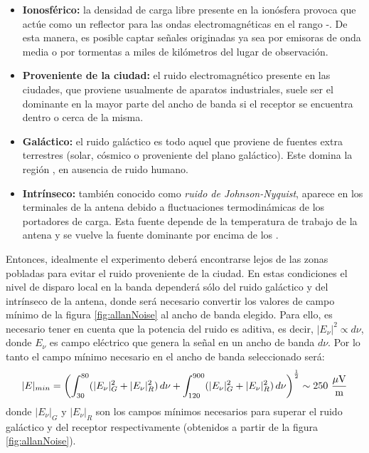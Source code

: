 	\begin{itemize}
	 \item \textbf{Ionosf\'erico:} la densidad de carga libre presente en la ion\'osfera provoca que act\'ue como un reflector para las ondas electromagn\'eticas en el rango -. De esta manera, es posible captar se\~nales originadas ya sea por emisoras de onda media o por tormentas a miles de kil\'ometros del lugar de observaci\'on.
	 \item \textbf{Proveniente de la ciudad:} el ruido electromagn\'etico presente en las ciudades, que proviene usualmente de aparatos industriales, suele ser el dominante en la mayor parte del ancho de banda si el receptor se encuentra dentro o cerca de la misma.
	 \item \textbf{Gal\'actico:} el ruido gal\'actico es todo aquel que proviene de fuentes extra terrestres (solar, c\'osmico o proveniente del plano gal\'actico). Este domina la regi\'on , en ausencia de ruido humano.
	 \item \textbf{Intr\'inseco:} tambi\'en conocido como \emph{ruido de Johnson-Nyquist}, aparece en los terminales de la antena debido a fluctuaciones termodin\'amicas de los portadores de carga. Esta fuente depende de la temperatura de trabajo de la antena y se vuelve la fuente dominante por encima de los .
	\end{itemize}
	
	Entonces, idealmente el experimento deber\'a encontrarse lejos de las zonas pobladas para evitar el ruido proveniente de la ciudad.
	En estas condiciones el nivel de disparo local en la banda  depender\'a s\'olo del ruido gal\'actico y del intr\'inseco de la antena, donde ser\'a necesario convertir los valores de campo m\'inimo de la figura \ref{fig:allanNoise} al ancho de banda elegido.
	Para ello, es necesario tener en cuenta que la potencia del ruido es aditiva, es decir, $|E_\nu|^2\propto d\nu$, donde $E_\nu$ es campo el\'ectrico que genera la se\~nal en un ancho de banda $d\nu$.
	Por lo tanto el campo m\'inimo necesario en el ancho de banda seleccionado ser\'a:
	\begin{equation}
	|E|_{min}=\left(\int_{30}^{80}(|E_\nu|^2_G+|E_\nu|^2_R)\,d\nu+
	\int_{120}^{900}(|E_\nu|^2_G+|E_\nu|^2_R)\,d\nu
	\right)^\frac{1}{2}
	\sim 250 {\rm\ \dfrac{\mu V}{m}}
	\end{equation}
	donde $|E_\nu|_G$ y $|E_\nu|_R$ son los campos m\'inimos necesarios para superar el ruido gal\'actico y del receptor respectivamente (obtenidos a partir de la figura \ref{fig:allanNoise}).
	
